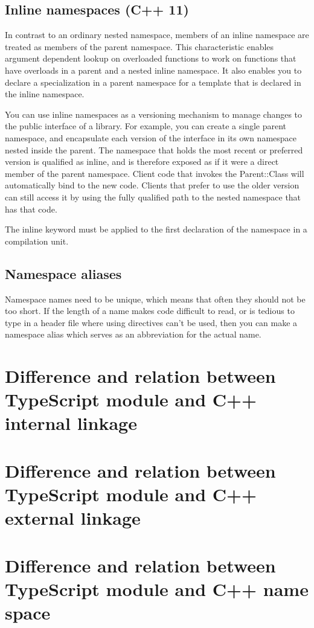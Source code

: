 \documentclass[a4paper]{report}
\begin{document}
\subsection{Inline namespaces (C++ 11)}
In contrast to an ordinary nested namespace, members of an inline namespace are treated as members of the parent namespace. This characteristic enables argument dependent lookup on overloaded functions to work on functions that have overloads in a parent and a nested inline namespace. It also enables you to declare a specialization in a parent namespace for a template that is declared in the inline namespace.
\par
You can use inline namespaces as a versioning mechanism to manage changes to the public interface of a library. For example, you can create a single parent namespace, and encapsulate each version of the interface in its own namespace nested inside the parent. The namespace that holds the most recent or preferred version is qualified as inline, and is therefore exposed as if it were a direct member of the parent namespace. Client code that invokes the Parent::Class will automatically bind to the new code. Clients that prefer to use the older version can still access it by using the fully qualified path to the nested namespace that has that code.
\par
The inline keyword must be applied to the first declaration of the namespace in a compilation unit.
\subsection{Namespace aliases}
Namespace names need to be unique, which means that often they should not be too short. If the length of a name makes code difficult to read, or is tedious to type in a header file where using directives can’t be used, then you can make a namespace alias which serves as an abbreviation for the actual name.
\section{Difference and relation between TypeScript module and C++ internal linkage}

\section{Difference and relation between TypeScript module and C++ external linkage}

\section{Difference and relation between TypeScript module and C++ name space}
\end{document}
